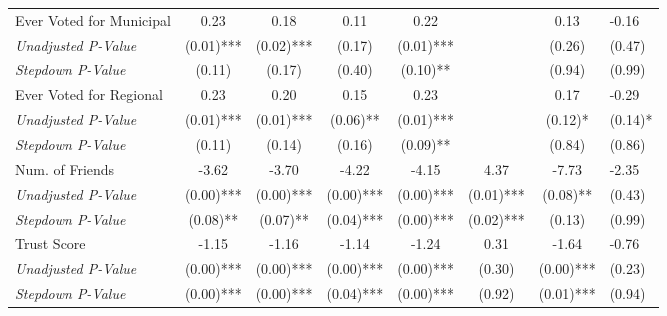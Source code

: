 \begin{tabular}{l c c c c c c}
Ever Voted for Municipal & 0.23 & 0.18 & 0.11 & 0.22 & & 0.13 & -0.16 \\
\quad \textit{Unadjusted P-Value} & (0.01)*** & (0.02)*** & (0.17) & (0.01)*** & & (0.26) & (0.47) \\
\quad \textit{Stepdown P-Value} & (0.11) & (0.17) & (0.40) & (0.10)** & & (0.94) & (0.99) \\
Ever Voted for Regional & 0.23 & 0.20 & 0.15 & 0.23 & & 0.17 & -0.29 \\
\quad \textit{Unadjusted P-Value} & (0.01)*** & (0.01)*** & (0.06)** & (0.01)*** & & (0.12)* & (0.14)* \\
\quad \textit{Stepdown P-Value} & (0.11) & (0.14) & (0.16) & (0.09)** & & (0.84) & (0.86) \\
Num. of Friends & -3.62 & -3.70 & -4.22 & -4.15 & 4.37 & -7.73 & -2.35 \\
\quad \textit{Unadjusted P-Value} & (0.00)*** & (0.00)*** & (0.00)*** & (0.00)*** & (0.01)*** & (0.08)** & (0.43) \\
\quad \textit{Stepdown P-Value} & (0.08)** & (0.07)** & (0.04)*** & (0.00)*** & (0.02)*** & (0.13) & (0.99) \\
Trust Score & -1.15 & -1.16 & -1.14 & -1.24 & 0.31 & -1.64 & -0.76 \\
\quad \textit{Unadjusted P-Value} & (0.00)*** & (0.00)*** & (0.00)*** & (0.00)*** & (0.30) & (0.00)*** & (0.23) \\
\quad \textit{Stepdown P-Value} & (0.00)*** & (0.00)*** & (0.04)*** & (0.00)*** & (0.92) & (0.01)*** & (0.94) \\
\bottomrule
\end{tabular}
